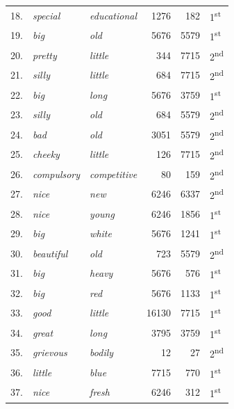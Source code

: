 \begin{table}[!htbp]
{\begin{tabular}[t]{rllrrl}
18. &  \textit{special} & \textit{educational} & \num{1276} & \num{182} & 1\textsuperscript{st} \\
19. &  \textit{big} & \textit{old} & \num{5676} & \num{5579} & 1\textsuperscript{st} \\
20. &  \textit{pretty} & \textit{little} & \num{344} & \num{7715} & 2\textsuperscript{nd} \\
21. &  \textit{silly} & \textit{little} & \num{684} & \num{7715} & 2\textsuperscript{nd} \\
22. &  \textit{big} & \textit{long} & \num{5676} & \num{3759} & 1\textsuperscript{st} \\
23. &  \textit{silly} & \textit{old} & \num{684} & \num{5579} & 2\textsuperscript{nd} \\
24. &  \textit{bad} & \textit{old} & \num{3051} & \num{5579} & 2\textsuperscript{nd} \\
25. &  \textit{cheeky} & \textit{little} & \num{126} & \num{7715} & 2\textsuperscript{nd} \\
26. &  \textit{compulsory} & \textit{competitive} & \num{80} & \num{159} & 2\textsuperscript{nd} \\
27. &  \textit{nice} & \textit{new} & \num{6246} & \num{6337} & 2\textsuperscript{nd} \\
28. &  \textit{nice} & \textit{young} & \num{6246} & \num{1856} & 1\textsuperscript{st} \\
29. &  \textit{big} & \textit{white} & \num{5676} & \num{1241} & 1\textsuperscript{st} \\
30. &  \textit{beautiful} & \textit{old} & \num{723} & \num{5579} & 2\textsuperscript{nd} \\
31. &  \textit{big} & \textit{heavy} & \num{5676} & \num{576} & 1\textsuperscript{st} \\
32. &  \textit{big} & \textit{red} & \num{5676} & \num{1133} & 1\textsuperscript{st} \\
33. &  \textit{good} & \textit{little} & \num{16130} & \num{7715} & 1\textsuperscript{st} \\
34. &  \textit{great} & \textit{long} & \num{3795} & \num{3759} & 1\textsuperscript{st} \\
35. &  \textit{grievous} & \textit{bodily} & \num{12} & \num{27} & 2\textsuperscript{nd} \\
36. &  \textit{little} & \textit{blue} & \num{7715} & \num{770} & 1\textsuperscript{st} \\
37. &  \textit{nice} & \textit{fresh} & \num{6246} & \num{312} & 1\textsuperscript{st} \\

\end{tabular}}
\end{table}
